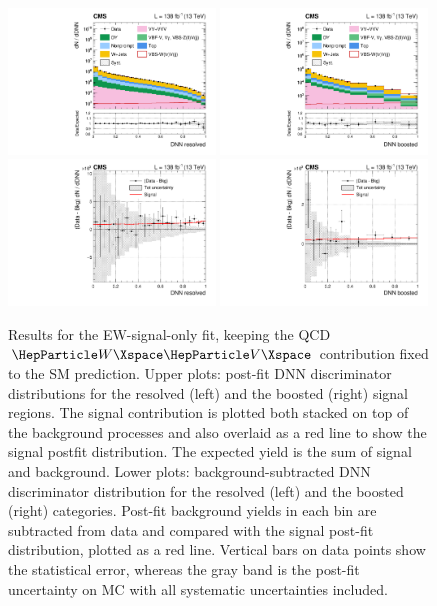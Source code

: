 \begin{figure}[!htb]
  \centering \includegraphics[width=0.49\textwidth]{Images/VBS_Studies/Figure_005-a.pdf} \includegraphics[width=0.49\textwidth]{Images/VBS_Studies/Figure_005-b.pdf} \includegraphics[width=0.49\textwidth]{Images/VBS_Studies/Figure_005-c.pdf} \includegraphics[width=0.49\textwidth]{Images/VBS_Studies/Figure_005-d.pdf} \caption{
    Results for the EW-signal-only fit, keeping the QCD $\PW\PV$ contribution fixed to the SM prediction.  Upper plots:
    post-fit DNN discriminator distributions for the resolved (left) and the boosted (right) signal regions.  The signal
    contribution is plotted both stacked on top of the background processes and also overlaid as a red line to show the signal postfit
    distribution. The expected yield is the sum of signal and background.  Lower plots: background-subtracted DNN
    discriminator distribution for the resolved (left) and the boosted (right) categories. Post-fit background yields in
    each bin are subtracted from data and compared with the signal post-fit distribution, plotted as a red line.
    Vertical bars on data points show the statistical error, whereas the gray band is the post-fit uncertainty on MC
    with all systematic uncertainties included.  } \label{fig:dnnbin}
\end{figure}

